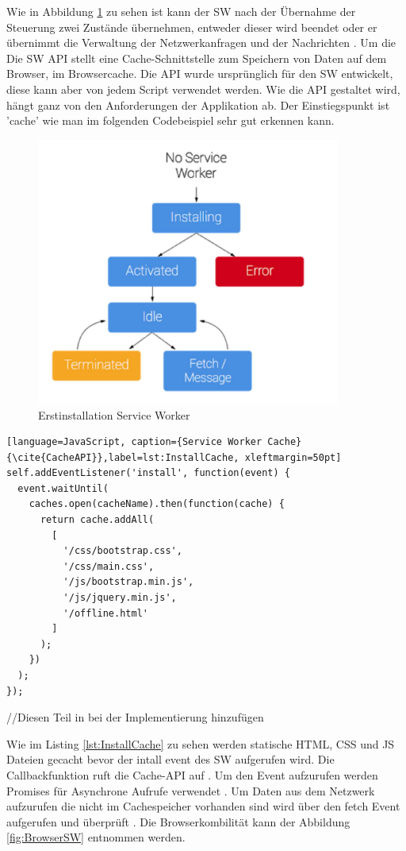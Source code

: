 Wie in Abbildung \ref{fig:Erstinstallation} zu sehen ist kann der \acs{SW} nach der Übernahme der Steuerung zwei Zustände übernehmen, entweder dieser wird beendet oder er übernimmt die Verwaltung der Netzwerkanfragen und der Nachrichten \cite{ServiceWorkerRegistration}.
Um die 
Die \acs{SW} API stellt eine Cache-Schnittstelle zum Speichern von Daten auf dem Browser, im Browsercache. Die API wurde ursprünglich für den \acs{SW} entwickelt, diese kann aber von jedem Script verwendet werden. 
Wie die API gestaltet wird, hängt ganz von den Anforderungen der Applikation ab.
Der Einstiegspunkt ist 'cache' wie man im folgenden Codebeispiel sehr gut erkennen kann.

\begin{figure}[h]
	\centering
	\includegraphics[width=10cm]{BilderAllgemein/InstallSW}\medskip
	\caption{Erstinstallation Service Worker \cite{ServiceWorkerRegistration}}
	\label{fig:Erstinstallation}
\end{figure}

\begin{lstlisting}[language=JavaScript, caption={Service Worker Cache} {\cite{CacheAPI}},label=lst:InstallCache, xleftmargin=50pt]
self.addEventListener('install', function(event) {
  event.waitUntil(
    caches.open(cacheName).then(function(cache) {
      return cache.addAll(
        [
          '/css/bootstrap.css',
          '/css/main.css',
          '/js/bootstrap.min.js',
          '/js/jquery.min.js',
          '/offline.html'
        ]
      );
    })
  );
});
\end{lstlisting}

//Diesen Teil in bei der Implementierung hinzufügen

Wie im Listing \ref{lst:InstallCache}  zu  sehen werden statische HTML, CSS und JS Dateien gecacht bevor der intall event des \acs{SW} aufgerufen wird. Die Callbackfunktion ruft die Cache-API auf \cite{CacheAPI}.
Um den Event aufzurufen werden Promises für Asynchrone Aufrufe verwendet .
Um Daten aus dem Netzwerk aufzurufen die nicht im Cachespeicher vorhanden sind wird über den fetch Event aufgerufen und überprüft \cite{Promises}.
Die Browserkombilität kann der Abbildung \ref{fig:BrowserSW} entnommen werden.





